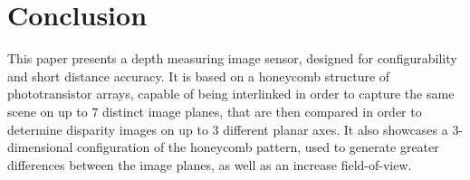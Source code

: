 \section{Conclusion}

This paper presents a depth measuring image sensor, designed for configurability and short distance
accuracy. It is based on a honeycomb structure of phototransistor arrays, capable of being interlinked
in order to capture the same scene on up to \(7\) distinct image planes, that are then compared 
in order to determine disparity images on up to \(3\) different planar axes. It also showcases
a 3-dimensional configuration of the honeycomb pattern, used to generate greater differences 
between the image planes, as well as an increase field-of-view.